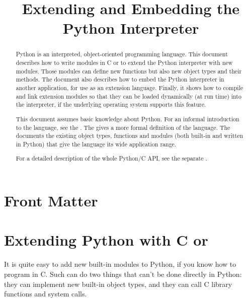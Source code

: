 \documentclass{manual}
\title{Extending and Embedding the Python Interpreter}
\begin{document}
\maketitle

\ifhtml
\chapter*{Front Matter\label{front}}
\fi




\begin{abstract}

\noindent
Python is an interpreted, object-oriented programming language.  This
document describes how to write modules in C or \Cpp{} to extend the
Python interpreter with new modules.  Those modules can define new
functions but also new object types and their methods.  The document
also describes how to embed the Python interpreter in another
application, for use as an extension language.  Finally, it shows how
to compile and link extension modules so that they can be loaded
dynamically (at run time) into the interpreter, if the underlying
operating system supports this feature.

This document assumes basic knowledge about Python.  For an informal
introduction to the language, see the
.  The
 gives a more
formal definition of the language.  The
 documents the
existing object types, functions and modules (both built-in and
written in Python) that give the language its wide application range.

For a detailed description of the whole Python/C API, see the separate
.

\end{abstract}

\tableofcontents


\chapter{Extending Python with C or \Cpp{} \label{intro}}


It is quite easy to add new built-in modules to Python, if you know
how to program in C.  Such  can do two things
that can't be done directly in Python: they can implement new built-in
object types, and they can call C library functions and system calls.
\end{document}
